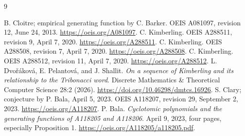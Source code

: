 \documentclass[11pt]{article}
\begin{document}
\begin{thebibliography}{9}
\raggedright
{} B. Cloitre; empirical generating function by C. Barker.
OEIS A081097, revision 12, June 24, 2013.
\url{https://oeis.org/A081097}.
 C. Kimberling. OEIS A288511, revision 9, April 7, 2020.
\url{https://oeis.org/A288511}.
 C. Kimberling. OEIS A288508, revision 7, April 7, 2020.
\url{https://oeis.org/A288508}.
 C. Kimberling. OEIS A288512, revision 11, April 7, 2020.
\url{https://oeis.org/A288512}.
 L. Dvo\v r\'akov\'a, E. Pelantov\'a, and J. Shallit.
\emph{On a sequence of Kimberling and its relationship to the Tribonacci word}.
Discrete Mathematics \& Theoretical Computer Science 28:2 (2026).
\url{https://doi.org/10.46298/dmtcs.16926}.
 S. Clary; conjecture by P. Bala, April 5, 2023.
OEIS A118207, revision 29, September 2, 2023.
\url{https://oeis.org/A118207}.
 P. Bala.
\emph{Cyclotomic polynomials and the generating functions of A118205 and A118206}.
April 9, 2023, four pages, especially Proposition 1.
\url{https://oeis.org/A118205/a118205.pdf}.
\end{thebibliography}
\end{document}
